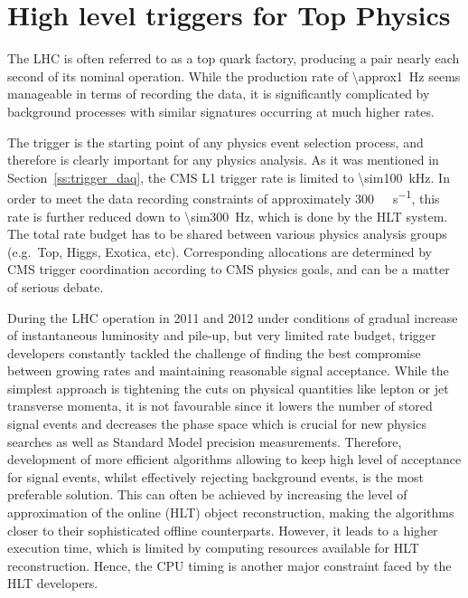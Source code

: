 
\chapter{High level triggers for Top Physics}
\label{c:service_work}
\ifpdf
    \graphicspath{{04_Service_work/plots/}}
\else
    \graphicspath{{04_Service_work/plots/EPS/}{04_Service_work/plots/}}
\fi

The LHC is often referred to as a top quark factory, producing a \ttbar pair nearly each second of its nominal
operation. While the production rate of \SI{\approx1}{\Hz} seems manageable in terms of recording the data, it is
significantly complicated by background processes with similar signatures occurring at much higher rates.

The trigger is the starting point of any physics event selection process, and therefore is clearly important for any
physics analysis. As it was mentioned in Section~\ref{ss:trigger_daq}, the CMS L1 trigger rate is limited to
\SI{\sim100}{\kilo\hertz}. In order to meet the data recording constraints of approximately
\SI{300}{\mega\byte\per\second}, this rate is further reduced down to \SI{\sim300}{\Hz}, which is done by the HLT
system. The total rate budget has to be shared between various physics analysis groups (e.g.\ Top, Higgs, Exotica, etc).
Corresponding allocations are determined by CMS trigger coordination according to CMS physics goals, and can be a matter
of serious debate.

During the LHC operation in 2011 and 2012 under conditions of gradual increase of instantaneous luminosity and pile-up,
but very limited rate budget, trigger developers constantly tackled the challenge of finding the best compromise between
growing rates and maintaining reasonable signal acceptance. While the simplest approach is tightening the cuts on
physical quantities like lepton or jet transverse momenta, it is not favourable since it lowers the number of stored
signal events and decreases the phase space which is crucial for new physics searches as well as Standard Model
precision measurements. Therefore, development of more efficient algorithms allowing to keep high level of acceptance
for signal events, whilst effectively rejecting background events, is the most preferable solution. This can often be
achieved by increasing the level of approximation of the online (HLT) object reconstruction, making the algorithms
closer to their sophisticated offline counterparts. However, it leads to a higher execution time, which is limited by
computing resources available for HLT reconstruction. Hence, the CPU timing is another major constraint faced by the HLT
developers.

